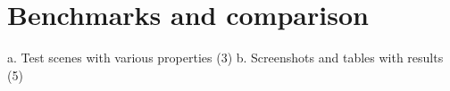 
\chapter{Benchmarks and comparison}

a.	Test scenes with various properties (3)
b.	Screenshots and tables with results (5)
